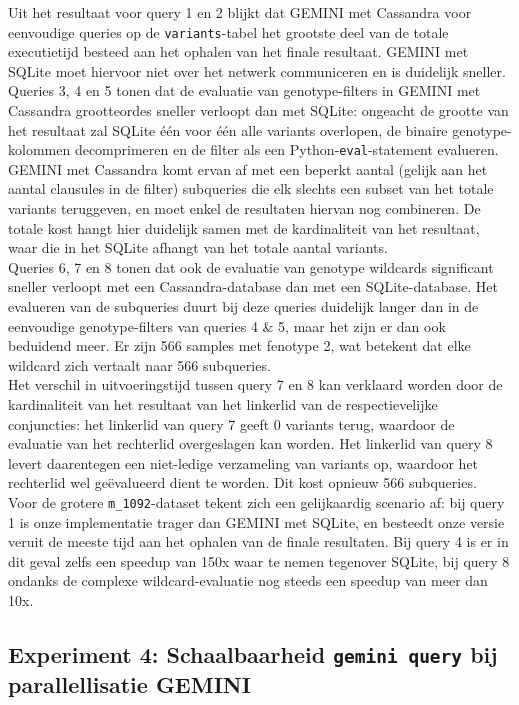 Uit het resultaat voor query 1 en 2 blijkt dat GEMINI met Cassandra voor eenvoudige queries op de \texttt{variants}-tabel het grootste deel van de totale executietijd besteed aan het ophalen van het finale resultaat. GEMINI met SQLite moet hiervoor niet over het netwerk communiceren en is duidelijk sneller.\\
Queries 3, 4 en 5 tonen dat de evaluatie van genotype-filters in GEMINI met Cassandra grootteordes sneller verloopt dan met SQLite: ongeacht de grootte van het resultaat zal SQLite \'e\'en voor \'e\'en alle variants overlopen, de binaire genotype-kolommen decomprimeren en de filter als een Python-\texttt{eval}-statement evalueren. GEMINI met Cassandra komt ervan af met een beperkt aantal (gelijk aan het aantal clausules in de filter) subqueries die elk slechts een subset van het totale variants teruggeven, en moet enkel de resultaten hiervan nog combineren. De totale kost hangt hier duidelijk samen met de kardinaliteit van het resultaat, waar die in het SQLite afhangt van het totale aantal variants.\\
Queries 6, 7 en 8 tonen dat ook de evaluatie van genotype wildcards significant sneller verloopt met een Cassandra-database dan met een SQLite-database. Het evalueren van de subqueries duurt bij deze queries duidelijk langer dan in de eenvoudige genotype-filters van queries 4 \& 5, maar het zijn er dan ook beduidend meer. Er zijn 566 samples met fenotype 2, wat betekent dat elke wildcard zich vertaalt naar 566 subqueries. \\
Het verschil in uitvoeringstijd tussen query 7 en 8 kan verklaard worden door de kardinaliteit van het resultaat van het linkerlid van de respectievelijke conjuncties: het linkerlid van query 7 geeft 0 variants terug, waardoor de evaluatie van het rechterlid overgeslagen kan worden. Het linkerlid van query 8 levert daarentegen een niet-ledige verzameling van variants op, waardoor het rechterlid wel ge\"evalueerd dient te worden. Dit kost opnieuw 566 subqueries.\\

Voor de grotere \texttt{m\_1092}-dataset tekent zich een gelijkaardig scenario af: bij query 1 is onze implementatie trager dan GEMINI met SQLite, en besteedt onze versie veruit de meeste tijd aan het ophalen van de finale resultaten. Bij query 4 is er in dit geval zelfs een speedup van 150x waar te nemen tegenover SQLite, bij query 8 ondanks de complexe wildcard-evaluatie nog steeds een speedup van meer dan 10x. 

\subsection{Experiment 4: Schaalbaarheid \texttt{gemini query} bij parallellisatie GEMINI}
\label{exp4}

